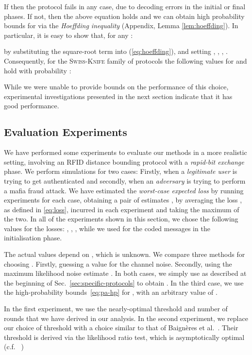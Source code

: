 \documentclass[a4paper]{article}
\newcommand \Swiss {\textsc{Swiss-Knife}}
\theoremstyle{plain} \newtheorem{remark}{Remark}
\theoremstyle{plain} \newtheorem{definition}{Definition}
\theoremstyle{plain} \newtheorem{example}{Example}
\theoremstyle{plain} \newtheorem{assumption}{Assumption}
\theoremstyle{plain} \newtheorem{conjecture}{Conjecture}
\theoremstyle{plain} \newtheorem{theorem}{Theorem}
\theoremstyle{plain} \newtheorem{proposition}{Proposition}
\theoremstyle{plain} \newtheorem{lemma}{Lemma}
\theoremstyle{plain} \newtheorem{corollary}{Corollary}
\begin{document}
If  then the protocol fails in any case, due
to decoding errors in the initial or final phases.  If not, then the
above equation holds and we can obtain high probability bounds for
 via the \textit{Hoeffding inequality} (Appendix,  Lemma \ref{lem:hoeffding}).  In particular, it is easy to
show that, for any :

by substituting the square-root term into (\ref{eq:hoeffding}), and
setting , , , .
Consequently, for the {\Swiss} family of protocols the following
values for  and  hold with probability :

While we were unable to provide bounds on the performance of this
choice, experimental investigations presented in the next section
indicate that it has good performance.


\subsection{Evaluation Experiments}
We have performed some experiments to evaluate our methods in a more
realistic setting, involving an RFID distance bounding protocol with a
\textit{rapid-bit exchange} phase.  We perform simulations for two
cases: Firstly, when a \textit{legitimate user}  is trying to get
authenticated and secondly, when an \textit{adversary}  is trying
to perform a mafia fraud attack.  We have estimated the
\textit{worst-case expected loss} by running  experiments for
each case, obtaining a pair of estimates ,
 by averaging the loss , as defined in
\eqref{eq:loss}, incurred in each experiment and taking the maximum of
the two.  In all of the experiments shown in this section, we chose
the following values for the losses: , , , while we used  for the coded messages in the
initialisation phase.

The actual values  depend on , which is unknown. We
compare three methods for choosing . Firstly, guessing a
value  for the channel noise. Secondly, using the maximum
likelihood noise estimate .  In both
cases, we simply use  as described at the beginning of
Sec.~\ref{sec:specific-protocols} to obtain .  In the third
case, we use the high-probability bounds~\eqref{eq:pa-hp} for , with an arbitrary value of .

In the first experiment, we use the nearly-optimal threshold and
number of rounds that we have derived in our analysis.  In the second
experiment, we replace our choice of threshold with a choice similar
to that of Baign\`{e}res et al.~\cite{ProvSec2010}. Their threshold is
derived via the likelihood ratio test, which is asymptotically optimal
(c.f. ~\cite{Degroot:OptimalStatisticalDecisions,Chernoff:SequentialDesignExperiments})
\end{document}
